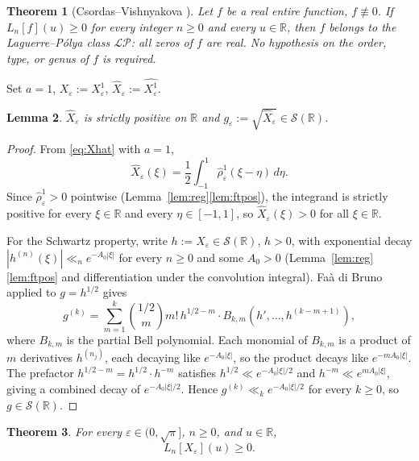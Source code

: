 \documentclass[12pt]{amsart}
\newtheorem{theorem}{Theorem}
\newtheorem{lemma}[theorem]{Lemma}
\theoremstyle{remark}
\begin{document}
\begin{theorem}[Csordas--Vishnyakova {\cite[Thm.~2.3]{CV}}]
\label{thm:CV}
Let $f$ be a real entire function, $f\not\equiv 0$.  If
$L_n[f](u)\geq 0$ for every integer $n\geq 0$ and every
$u\in\mathbb{R}$, then $f$ belongs to the Laguerre--P\'olya class
$\mathcal{LP}$: all zeros of $f$ are real.  No hypothesis on the
order, type, or genus of $f$ is required.
\end{theorem}

Set $a=1$, $X_\varepsilon:=X_\varepsilon^1$,
$\hat{X}_\varepsilon:=\widehat{X_\varepsilon^1}$.

\begin{lemma}\label{lem:sqrt}
$\hat X_\varepsilon$ is strictly positive on $\mathbb{R}$ and
$g_\varepsilon:=\sqrt{\hat X_\varepsilon}\in\mathcal{S}(\mathbb{R})$.
\end{lemma}

\begin{proof}
From \eqref{eq:Xhat} with $a=1$,
\[
  \hat X_\varepsilon(\xi)
  =\frac{1}{2}\int_{-1}^{1}\hat\rho_\varepsilon^1(\xi-\eta)\,d\eta.
\]
Since $\hat\rho_\varepsilon^1>0$ pointwise
(Lemma~\ref{lem:reg}\ref{lem:ftpos}), the integrand is strictly
positive for every $\xi\in\mathbb{R}$ and every $\eta\in[-1,1]$, so
$\hat X_\varepsilon(\xi)>0$ for all $\xi\in\mathbb{R}$.

For the Schwartz property, write $h:=\hat X_\varepsilon\in
\mathcal{S}(\mathbb{R})$, $h>0$, with exponential decay
$|h^{(n)}(\xi)|\ll_n e^{-A_0|\xi|}$ for every $n\geq 0$ and some
$A_0>0$ (Lemma~\ref{lem:reg}\ref{lem:ftpos} and differentiation under
the convolution integral).  Faà di Bruno applied to $g=h^{1/2}$ gives
\[
  g^{(k)}
  =\sum_{m=1}^{k}\binom{1/2}{m}m!\,h^{1/2-m}\cdot
   B_{k,m}(h',\dots,h^{(k-m+1)}),
\]
where $B_{k,m}$ is the partial Bell polynomial.  Each monomial of
$B_{k,m}$ is a product of $m$ derivatives $h^{(n_j)}$, each decaying
like $e^{-A_0|\xi|}$, so the product decays like $e^{-mA_0|\xi|}$.
The prefactor $h^{1/2-m}=h^{1/2}\cdot h^{-m}$ satisfies
$h^{1/2}\ll e^{-A_0|\xi|/2}$ and $h^{-m}\ll e^{mA_0|\xi|}$, giving a
combined decay of $e^{-A_0|\xi|/2}$.  Hence $g^{(k)}\ll_k
e^{-A_0|\xi|/2}$ for every $k\geq 0$, so $g\in\mathcal{S}(\mathbb{R})$.
\end{proof}

\begin{theorem}\label{thm:laguerre}
For every $\varepsilon\in(0,\sqrt{\pi}]$, $n\geq 0$, and
$u\in\mathbb{R}$,
\begin{equation}\label{eq:Lnpos}
  L_n[X_\varepsilon](u)\geq 0.
\end{equation}
\end{theorem}
\end{document}
